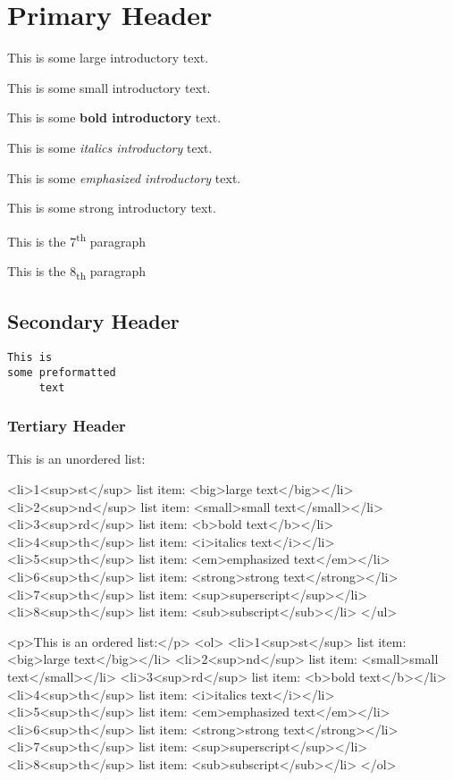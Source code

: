 \documentclass[12pt]{article}
\begin{document}
\section{Primary Header}This is some {\Large large introductory} text.

This is some {\scriptsize small introductory} text.

This is some \textbf{bold introductory} text.

This is some \textit{italics introductory} text.

This is some \emph{emphasized introductory} text.

This is some \textmd{strong introductory} text.

This is the 7\textsuperscript{th} paragraph

This is the 8\textsubscript{th} paragraph

\subsection{Secondary Header}\begin{verbatim}This is
some preformatted
     text\end{verbatim}\subsubsection{Tertiary Header}This is an unordered list:


    <li>1<sup>st</sup> list item: <big>large text</big></li>
    <li>2<sup>nd</sup> list item: <small>small text</small></li>
    <li>3<sup>rd</sup> list item: <b>bold text</b></li>
    <li>4<sup>th</sup> list item: <i>italics text</i></li>
    <li>5<sup>th</sup> list item: <em>emphasized text</em></li>
    <li>6<sup>th</sup> list item: <strong>strong text</strong></li>
    <li>7<sup>th</sup> list item: <sup>superscript</sup></li>
    <li>8<sup>th</sup> list item: <sub>subscript</sub></li>
</ul>

<p>This is an ordered list:</p>
<ol>
    <li>1<sup>st</sup> list item: <big>large text</big></li>
    <li>2<sup>nd</sup> list item: <small>small text</small></li>
    <li>3<sup>rd</sup> list item: <b>bold text</b></li>
    <li>4<sup>th</sup> list item: <i>italics text</i></li>
    <li>5<sup>th</sup> list item: <em>emphasized text</em></li>
    <li>6<sup>th</sup> list item: <strong>strong text</strong></li>
    <li>7<sup>th</sup> list item: <sup>superscript</sup></li>
    <li>8<sup>th</sup> list item: <sub>subscript</sub></li>
</ol>
\end{document}
